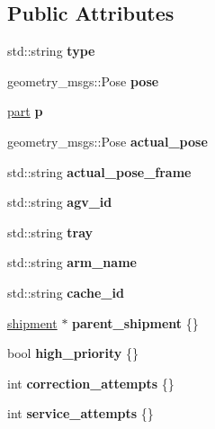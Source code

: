\subsection*{Public Attributes}
\begin{DoxyCompactItemize}
\item 
\mbox{\label{structProduct_a9794c822ffdfc304df2c70ba43af1916}} 
std\+::string {\bfseries type}
\item 
\mbox{\label{structProduct_afdb4498246a795bdc91b8df0ba2f76b4}} 
geometry\+\_\+msgs\+::\+Pose {\bfseries pose}
\item 
\mbox{\label{structProduct_a480966ce45a977dc57781b84e540292d}} 
\hyperlink{structPart}{part} {\bfseries p}
\item 
\mbox{\label{structProduct_af9697472e58b87439879eb87c8fff287}} 
geometry\+\_\+msgs\+::\+Pose {\bfseries actual\+\_\+pose}
\item 
\mbox{\label{structProduct_a23cb5e2afba18fde245d3ea43aaf75db}} 
std\+::string {\bfseries actual\+\_\+pose\+\_\+frame}
\item 
\mbox{\label{structProduct_a362e1bca7dacf78ca01aa09cba4bdbb1}} 
std\+::string {\bfseries agv\+\_\+id}
\item 
\mbox{\label{structProduct_ab8ab1c46e9406bdb591c8b32c3d6bb5f}} 
std\+::string {\bfseries tray}
\item 
\mbox{\label{structProduct_ab7b619e3758e153315fd6960d025a7ba}} 
std\+::string {\bfseries arm\+\_\+name}
\item 
\mbox{\label{structProduct_aec6bebef64a095bd9ca08c3c1d107d2b}} 
std\+::string {\bfseries cache\+\_\+id}
\item 
\mbox{\label{structProduct_a6cdcd7f1ac8ef015c20baa1c93765885}} 
\hyperlink{structShipment}{shipment} $\ast$ {\bfseries parent\+\_\+shipment} \{\}
\item 
\mbox{\label{structProduct_acf26204944fd9b2806361d166004ce26}} 
bool {\bfseries high\+\_\+priority} \{\}
\item 
\mbox{\label{structProduct_a81bc7bfb8798574d9b5f58dec68257e2}} 
int {\bfseries correction\+\_\+attempts} \{\}
\item 
\mbox{\label{structProduct_abc4891099fad3ed0adc35ef02b5ef8be}} 
int {\bfseries service\+\_\+attempts} \{\}
\end{DoxyCompactItemize}


